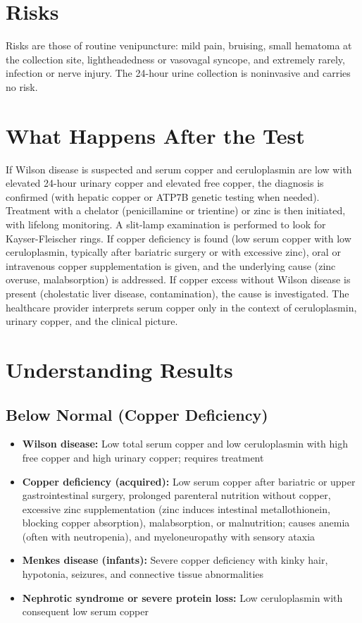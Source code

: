 \section*{Risks}
Risks are those of routine venipuncture: mild pain, bruising, small hematoma at the collection site, lightheadedness or vasovagal syncope, and extremely rarely, infection or nerve injury. The 24-hour urine collection is noninvasive and carries no risk.

\section*{What Happens After the Test}
If Wilson disease is suspected and serum copper and ceruloplasmin are low with elevated 24-hour urinary copper and elevated free copper, the diagnosis is confirmed (with hepatic copper or ATP7B genetic testing when needed). Treatment with a chelator (penicillamine or trientine) or zinc is then initiated, with lifelong monitoring. A slit-lamp examination is performed to look for Kayser-Fleischer rings. If copper deficiency is found (low serum copper with low ceruloplasmin, typically after bariatric surgery or with excessive zinc), oral or intravenous copper supplementation is given, and the underlying cause (zinc overuse, malabsorption) is addressed. If copper excess without Wilson disease is present (cholestatic liver disease, contamination), the cause is investigated. The healthcare provider interprets serum copper only in the context of ceruloplasmin, urinary copper, and the clinical picture.

\section*{Understanding Results}

\subsection*{Below Normal (Copper Deficiency)}
\begin{itemize}
  \item \textbf{Wilson disease:} Low total serum copper and low ceruloplasmin with high free copper and high urinary copper; requires treatment
  \item \textbf{Copper deficiency (acquired):} Low serum copper after bariatric or upper gastrointestinal surgery, prolonged parenteral nutrition without copper, excessive zinc supplementation (zinc induces intestinal metallothionein, blocking copper absorption), malabsorption, or malnutrition; causes anemia (often with neutropenia), and myeloneuropathy with sensory ataxia \cite{kumar2006copper}
  \item \textbf{Menkes disease (infants):} Severe copper deficiency with kinky hair, hypotonia, seizures, and connective tissue abnormalities
  \item \textbf{Nephrotic syndrome or severe protein loss:} Low ceruloplasmin with consequent low serum copper
\end{itemize}

